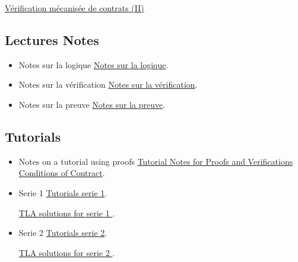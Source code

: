 \documentclass[ 12pt]{article}
\begin{document}
\href{http://mery54.github.io/teaching/movex/lecturesnotes/movexlecture5.pdf}{{Vérification  mécanisée de contrats} (II)}



  

  \subsection{Lectures Notes}

  \begin{itemize}
  \item[]   Notes sur la logique
    \href{http://mery54.github.io/teaching/movex/lecturesnotes/preprint-chapterlogique.pdf}{Notes sur la logique}.

     \item[]   Notes sur la vérification
    \href{http://mery54.github.io/teaching/movex/lecturesnotes/preprint-chapterverification.pdf}{Notes
      sur la vérification}.

     \item[]   Notes sur la preuve
    \href{http://mery54.github.io/teaching/movex/lecturesnotes/preprint-chapterprouver.pdf}{Notes
      sur la preuve}.

  \end{itemize}


  

\subsection{Tutorials}



\begin{itemize}
  
\item[]  Notes on a tutorial using proofs 
    \href{http://mery54.github.io/teaching/movex/lecturesnotes/notestuto3.pdf}{Tutorial
      Notes for Proofs and Verifications Conditions of Contract}.
  \item[]   Serie  1
    \href{http://mery54.github.io/teaching/movex/lecturesnotes/movexserie1.pdf}{Tutorials 
      serie 1}.


    
        \href{http://mery54.github.io/teaching/movex/models/serie1.zip}{TLA 
           solutions for serie 1
         }.
\item[]   Serie  2
    \href{http://mery54.github.io/teaching/movex/lecturesnotes/movexserie2.pdf}{Tutorials 
      serie 2}.


           \href{http://mery54.github.io/teaching/movex/models/serie2.zip}{TLA 
             solutions for serie 2
             }.
  \end{itemize}
\end{document}
